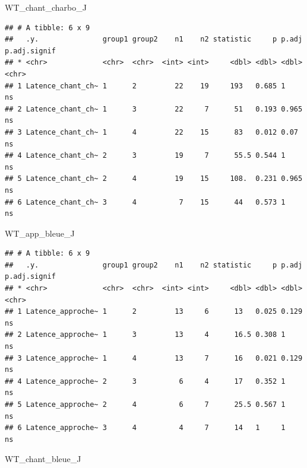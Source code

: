 \documentclass[
  french,
]{article}
\newenvironment{Shaded}{\begin{snugshade}}{\end{snugshade}}
\newcommand{\NormalTok}[1]{#1}
\begin{document}
\begin{Shaded}
\begin{Highlighting}[]
\NormalTok{WT\_chant\_charbo\_J}
\end{Highlighting}
\end{Shaded}

\begin{verbatim}
## # A tibble: 6 x 9
##   .y.               group1 group2    n1    n2 statistic     p p.adj p.adj.signif
## * <chr>             <chr>  <chr>  <int> <int>     <dbl> <dbl> <dbl> <chr>       
## 1 Latence_chant_ch~ 1      2         22    19     193   0.685 1     ns          
## 2 Latence_chant_ch~ 1      3         22     7      51   0.193 0.965 ns          
## 3 Latence_chant_ch~ 1      4         22    15      83   0.012 0.07  ns          
## 4 Latence_chant_ch~ 2      3         19     7      55.5 0.544 1     ns          
## 5 Latence_chant_ch~ 2      4         19    15     108.  0.231 0.965 ns          
## 6 Latence_chant_ch~ 3      4          7    15      44   0.573 1     ns
\end{verbatim}

\begin{Shaded}
\begin{Highlighting}[]
\NormalTok{WT\_app\_bleue\_J}
\end{Highlighting}
\end{Shaded}

\begin{verbatim}
## # A tibble: 6 x 9
##   .y.               group1 group2    n1    n2 statistic     p p.adj p.adj.signif
## * <chr>             <chr>  <chr>  <int> <int>     <dbl> <dbl> <dbl> <chr>       
## 1 Latence_approche~ 1      2         13     6      13   0.025 0.129 ns          
## 2 Latence_approche~ 1      3         13     4      16.5 0.308 1     ns          
## 3 Latence_approche~ 1      4         13     7      16   0.021 0.129 ns          
## 4 Latence_approche~ 2      3          6     4      17   0.352 1     ns          
## 5 Latence_approche~ 2      4          6     7      25.5 0.567 1     ns          
## 6 Latence_approche~ 3      4          4     7      14   1     1     ns
\end{verbatim}

\begin{Shaded}
\begin{Highlighting}[]
\NormalTok{WT\_chant\_bleue\_J}
\end{Highlighting}
\end{Shaded}
\end{document}
